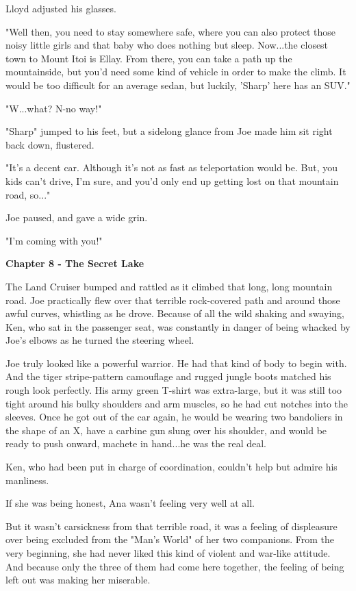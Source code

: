 \documentclass[
]{article}
\begin{document}
Lloyd adjusted his glasses.

"Well then, you need to stay somewhere safe, where you can also protect
those noisy little girls and that baby who does nothing but sleep.
Now...the closest town to Mount Itoi is Ellay. From there, you can take
a path up the mountainside, but you'd need some kind of vehicle in order
to make the climb. It would be too difficult for an average sedan, but
luckily, 'Sharp' here has an SUV."

"W...what? N-no way!"

"Sharp" jumped to his feet, but a sidelong glance from Joe made him sit
right back down, flustered.

"It's a decent car. Although it's not as fast as teleportation would be.
But, you kids can't drive, I'm sure, and you'd only end up getting lost
on that mountain road, so..."

Joe paused, and gave a wide grin.

"I'm coming with you!"

\textbf{Chapter 8 - The Secret Lake}

The Land Cruiser bumped and rattled as it climbed that long, long
mountain road. Joe practically flew over that terrible rock-covered path
and around those awful curves, whistling as he drove. Because of all the
wild shaking and swaying, Ken, who sat in the passenger seat, was
constantly in danger of being whacked by Joe's elbows as he turned the
steering wheel.

Joe truly looked like a powerful warrior. He had that kind of body to
begin with. And the tiger stripe-pattern camouflage and rugged jungle
boots matched his rough look perfectly. His army green T-shirt was
extra-large, but it was still too tight around his bulky shoulders and
arm muscles, so he had cut notches into the sleeves. Once he got out of
the car again, he would be wearing two bandoliers in the shape of an X,
have a carbine gun slung over his shoulder, and would be ready to push
onward, machete in hand...he was the real deal.

Ken, who had been put in charge of coordination, couldn't help but
admire his manliness.

If she was being honest, Ana wasn't feeling very well at all.

But it wasn't carsickness from that terrible road, it was a feeling of
displeasure over being excluded from the "Man's World" of her two
companions. From the very beginning, she had never liked this kind of
violent and war-like attitude. And because only the three of them had
come here together, the feeling of being left out was making her
miserable.
\end{document}
